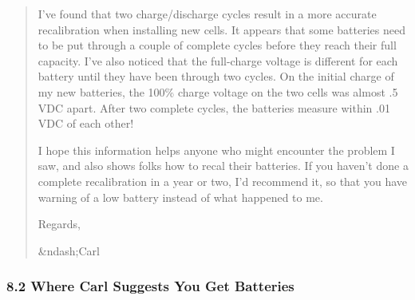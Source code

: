 \begin{quote}
I've found that two charge/discharge cycles result in a more accurate
recalibration when installing new cells. It appears that some batteries need
to be put through a couple of complete cycles before they reach their full
capacity. I've also noticed that the full-charge voltage is different for each
battery until they have been through two cycles. On the initial charge of my
new batteries, the 100\% charge voltage on the two cells was almost .5 VDC
apart. After two complete cycles, the batteries measure within .01 VDC of each
other!  

I hope this information helps anyone who might encounter the problem I saw,
and also shows folks how to recal their batteries. If you haven't done a
complete recalibration in a year or two, I'd recommend it, so that you have
warning of a low battery instead of what happened to me.  

Regards,  

\&ndash;Carl 
\end{quote}

\label{Where-Carl-Suggests-You-Get-Batteries}

\subsubsection*{8.2 Where Carl Suggests You Get Batteries}

\label{index-Batteries-146}

